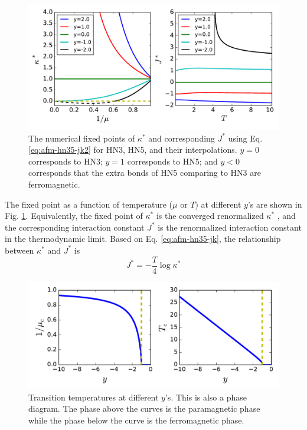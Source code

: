 \begin{figure}
\centering \includegraphics[width=0.9\columnwidth]{Chapter-3/HN35_KJvsTys.pdf}
\protect\caption{The numerical fixed points of $\kappa^*$ and corresponding $J^*$ using Eq. \ref{eq:afm-hn35-jk2} for HN3, HN5, and their interpolations. $y=0$ corresponds to HN3; $y=1$ corresponds to HN5; and $y<0$ corresponds that the extra bonds of HN5 comparing to HN3 are ferromagnetic. }
\label{fig:afm-HN35KJ_ys} 
\end{figure}


The fixed point as a function of temperature ($\mu$ or $T$) at different $y$'s are shown in Fig. \ref{fig:afm-HN35KJ_ys}. Equivalently, the fixed point of $\kappa^*$ is the converged renormalized $\kappa^*$ , and the corresponding interaction constant $J^*$ is the renormalized interaction constant in the thermodynamic limit. Based on Eq. \ref{eq:afm-hn35-jk}, the relationship between $\kappa^*$ and $J^*$ is
\begin{equation}
J^* = -\frac{T}{4} \log \kappa^*
\label{eq:afm-hn35-jk2}
\end{equation}




\begin{figure}
\centering \includegraphics[width=0.9\columnwidth]{Chapter-3/HN35ysTransVsY.pdf}
\protect\caption{Transition temperatures at different $y$'s. This is also a phase diagram. The phase above the curves is the paramagnetic phase while the phase below the curve is the ferromagnetic phase. }
\label{fig:afm-hn35transys} 
\end{figure}

